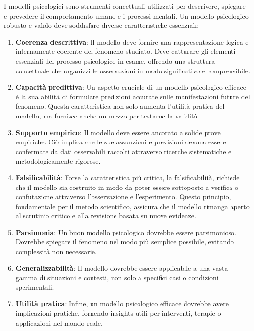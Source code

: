 \documentclass[
  letterpaper,
  krantz2]{{[}./krantz{]}}
\providecommand{\tightlist}{%
  \setlength{\itemsep}{0pt}\setlength{\parskip}{0pt}}\usepackage{longtable,booktabs,array}
\begin{document}
I modelli psicologici sono strumenti concettuali utilizzati per
descrivere, spiegare e prevedere il comportamento umano e i processi
mentali. Un modello psicologico robusto e valido deve soddisfare diverse
caratteristiche essenziali:

\begin{enumerate}
\def\labelenumi{\arabic{enumi}.}
\tightlist
\item
  \textbf{Coerenza descrittiva}: Il modello deve fornire una
  rappresentazione logica e internamente coerente del fenomeno studiato.
  Deve catturare gli elementi essenziali del processo psicologico in
  esame, offrendo una struttura concettuale che organizzi le
  osservazioni in modo significativo e comprensibile.
\item
  \textbf{Capacità predittiva}: Un aspetto cruciale di un modello
  psicologico efficace è la sua abilità di formulare predizioni accurate
  sulle manifestazioni future del fenomeno. Questa caratteristica non
  solo aumenta l'utilità pratica del modello, ma fornisce anche un mezzo
  per testarne la validità.
\item
  \textbf{Supporto empirico}: Il modello deve essere ancorato a solide
  prove empiriche. Ciò implica che le sue assunzioni e previsioni devono
  essere confermate da dati osservabili raccolti attraverso ricerche
  sistematiche e metodologicamente rigorose.
\item
  \textbf{Falsificabilità}: Forse la caratteristica più critica, la
  falsificabilità, richiede che il modello sia costruito in modo da
  poter essere sottoposto a verifica o confutazione attraverso
  l'osservazione e l'esperimento. Questo principio, fondamentale per il
  metodo scientifico, assicura che il modello rimanga aperto al
  scrutinio critico e alla revisione basata su nuove evidenze.
\item
  \textbf{Parsimonia}: Un buon modello psicologico dovrebbe essere
  parsimonioso. Dovrebbe spiegare il fenomeno nel modo più semplice
  possibile, evitando complessità non necessarie.
\item
  \textbf{Generalizzabilità}: Il modello dovrebbe essere applicabile a
  una vasta gamma di situazioni e contesti, non solo a specifici casi o
  condizioni sperimentali.
\item
  \textbf{Utilità pratica}: Infine, un modello psicologico efficace
  dovrebbe avere implicazioni pratiche, fornendo insights utili per
  interventi, terapie o applicazioni nel mondo reale.
\end{enumerate}
\end{document}
